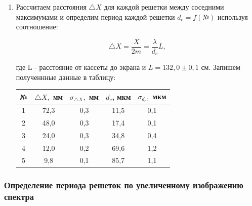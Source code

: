 \documentclass[a4paper, 12pt]{article}%
\begin{document}
\begin{enumerate}
\item Рассчитаем расстояния $\bigtriangleup X$ для каждой решетки между соседними максимумами и определим период каждой решетки $d_c = f(№)$ используя соотношение:

\begin{equation}
\bigtriangleup X = \frac{X}{2m} = \frac{\lambda}{d_c} L,
\end{equation}

где L - расстояние от кассеты до экрана и $L = 132,0 \pm 0,1$ см. Запишем полученнные данные в таблицу:

\begin{center}
\begin{tabular}{|c|c|c|c|c|}
\hline 
№ & $\bigtriangleup X,$ мм & $\sigma_{\bigtriangleup X},$ мм & $d_c$, мкм & $\sigma_{d_c},$ мкм \\ 
\hline 
1 & 72,3 & 0,3 & 11,5 & 0,1 \\ 
\hline 
2 & 48,0 & 0,3 & 17,4 & 0,1 \\ 
\hline 
3 & 24,0 & 0,3 & 34,8 & 0,4\\ 
\hline 
4 & 12,0 & 0,2 & 69,6 & 1,2\\ 
\hline 
5 & 9,8 & 0,1 & 85,7 & 1,1 \\ 
\hline 
\end{tabular} 
\end{center}

\end{enumerate}

\subsubsection*{Определение периода решеток по увеличенному изображению спектра}
\end{document}
